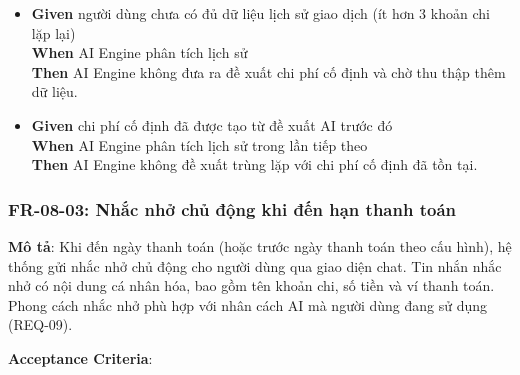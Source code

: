 \begin{itemize}
\item \textbf{Given} người dùng chưa có đủ dữ liệu lịch sử giao dịch (ít hơn 3 khoản chi lặp lại)  \\ \hspace*{1.5em}  \textbf{When} AI Engine phân tích lịch sử  \\ \hspace*{1.5em}  \textbf{Then} AI Engine không đưa ra đề xuất chi phí cố định và chờ thu thập thêm dữ liệu.
\item \textbf{Given} chi phí cố định đã được tạo từ đề xuất AI trước đó  \\ \hspace*{1.5em}  \textbf{When} AI Engine phân tích lịch sử trong lần tiếp theo  \\ \hspace*{1.5em}  \textbf{Then} AI Engine không đề xuất trùng lặp với chi phí cố định đã tồn tại.
\end{itemize}
\subsubsection{FR-08-03: Nhắc nhở chủ động khi đến hạn thanh toán}

\textbf{Mô tả}: Khi đến ngày thanh toán (hoặc trước ngày thanh toán theo cấu hình), hệ thống gửi nhắc nhở chủ động cho người dùng qua giao diện chat. Tin nhắn nhắc nhở có nội dung cá nhân hóa, bao gồm tên khoản chi, số tiền và ví thanh toán. Phong cách nhắc nhở phù hợp với nhân cách AI mà người dùng đang sử dụng (REQ-09).



\textbf{Acceptance Criteria}:


